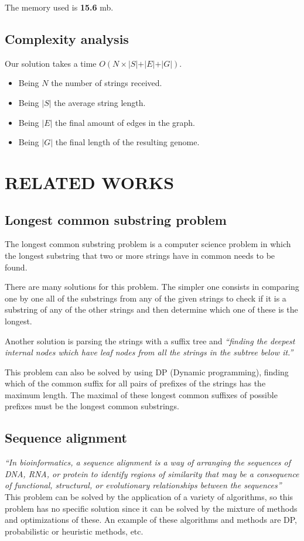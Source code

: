 The memory used is \textbf{15.6} mb.
\subsection{Complexity analysis}
Our solution takes a time
$O(N\times \lvert S \lvert + \lvert E \lvert + \lvert G \lvert)$.
\begin{itemize}
  \item Being $N$ the number of strings received.
  \item Being $\lvert S \lvert$ the average string length. 
  \item Being $\lvert E \lvert$ the final amount of edges in the graph.
  \item Being $\lvert G \lvert$ the final length of the resulting genome.
\end{itemize}





\section{RELATED WORKS}
\subsection{Longest common substring problem}
The longest common substring problem is a computer science problem in which the longest substring that two or more strings have in common needs to be found.

There are many solutions for this problem. The simpler one consists in comparing one by one all of the substrings from any of the given strings to check if it is a substring of any of the other strings and then determine which one of these is the longest.

Another solution is parsing the strings with a suffix tree and \textit{“finding the deepest internal nodes which have leaf nodes from all the strings in the subtree below it.”}

This problem can also be solved by using DP (Dynamic programming), finding which of the common suffix for all pairs of prefixes of the strings has the maximum length. The maximal of these longest common suffixes of possible prefixes must be the longest common substrings.

\subsection{Sequence alignment}
\textit{“In bioinformatics, a sequence alignment is a way of arranging the sequences of DNA, RNA, or protein to identify regions of similarity that may be a consequence of functional, structural, or evolutionary relationships between the sequences”}
This problem can be solved by the application of a variety of algorithms, so this problem has no specific solution since it can be solved by the mixture of methods and optimizations of these. An example of these algorithms and methods are DP, probabilistic or heuristic methods, etc.


